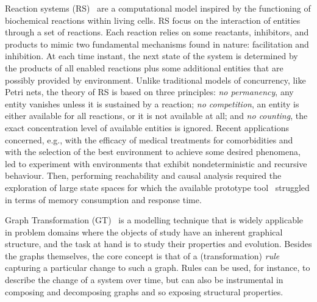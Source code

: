 \documentclass{llncs}
\begin{document}
Reaction systems (RS)~\cite{DBLP:journals/fuin/EhrenfeuchtR07} are a computational model inspired by the functioning of biochemical reactions within living cells. 
RS focus on the interaction of entities through a set of reactions. 
Each reaction relies on some reactants, inhibitors, and products to mimic two fundamental mechanisms found in nature: facilitation and inhibition.
At each time instant, the next state of the system is determined by the products of all enabled reactions plus some additional entities that are possibly provided by environment.
Unlike traditional models of concurrency, like Petri nets, the theory of RS is based on three principles: \emph{no permanency}, any entity vanishes unless it is sustained by a reaction; \emph{no competition}, an entity is either available for all reactions, or it is not available at all; and \emph{no counting}, the exact concentration level of available entities is ignored.
Recent applications concerned, e.g., with the efficacy of medical treatments for comorbidities and with the selection of the best environment to achieve some desired phenomena, led to experiment with environments that exhibit nondeterministic and recursive behaviour.
Then, performing reachability and causal analysis required the exploration of large state spaces for which the available prototype tool~\cite{DBLP:journals/tcs/BrodoBF21} struggled in terms of  memory consumption and response time.
 
Graph Transformation (GT)~\cite{DBLP:series/eatcs/EhrigEPT06,DBLP:books/sp/HeckelT20} is a modelling technique that is widely applicable in problem domains where the objects of study have an inherent graphical structure, and the task at hand is to study their properties and evolution. Besides the graphs themselves, the core concept is that of a (transformation) \emph{rule} capturing a particular change to such a graph. Rules can be used, for instance, to describe the change of a system over time, but can also be instrumental in composing and decomposing graphs and so exposing structural properties.
\end{document}
